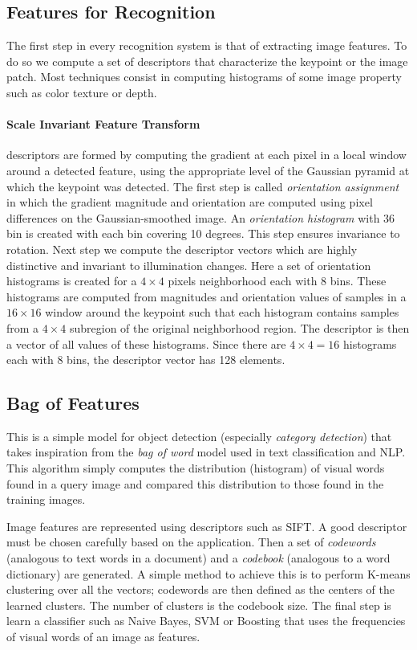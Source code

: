 \documentclass[a4paper,twocolumn]{article}
\begin{document}
\subsection{Features for Recognition}
The first step in every recognition system is that of extracting image features.
To do so we compute a set of descriptors that characterize the keypoint or the
image patch. Most techniques consist in computing histograms of some image
property such as color texture or depth.

\paragraph{Scale Invariant Feature Transform} descriptors are formed by computing the
gradient at each pixel in a local window around a detected feature, using
the appropriate level of the Gaussian pyramid at which the keypoint was
detected. The first step is called \textit{orientation assignment} in which the
gradient magnitude and orientation are computed using pixel differences on the
Gaussian-smoothed image. An \textit{orientation histogram} with 36 bin is
created with each bin covering 10 degrees. This step ensures invariance to
rotation. Next step we compute the descriptor vectors which are highly
distinctive and invariant to illumination changes. Here a set of orientation
histograms is created for a $4 \times 4$ pixels neighborhood each with 8 bins.
These histograms are computed from magnitudes and orientation values of samples
in a $16 \times 16$ window around the keypoint such that each histogram contains
samples from a $4 \times 4$ subregion of the original neighborhood region. The
descriptor is then a vector of all values of these histograms. Since there are
$4 \times 4 = 16$ histograms each with 8 bins, the descriptor vector has 128
elements.

\subsection{Bag of Features}
This is a simple model for object detection (especially \textit{category
detection}) that takes inspiration from the \textit{bag of word} model used in
text classification and NLP. This algorithm simply computes the distribution
(histogram) of visual words found in a query image and compared this
distribution to those found in the training images.

Image features are represented using descriptors such as SIFT. A good descriptor
must be chosen carefully based on the application. Then a set of
\textit{codewords} (analogous to text words in a document) and a \textit{codebook}
(analogous to a word dictionary) are generated. A simple method to achieve this
is to perform K-means clustering over all the vectors; codewords are then
defined as the centers of the learned clusters. The number of clusters is the
codebook size. The final step is learn a classifier such as Naive Bayes, SVM or
Boosting that uses the frequencies of visual words of an image as features.
\end{document}
